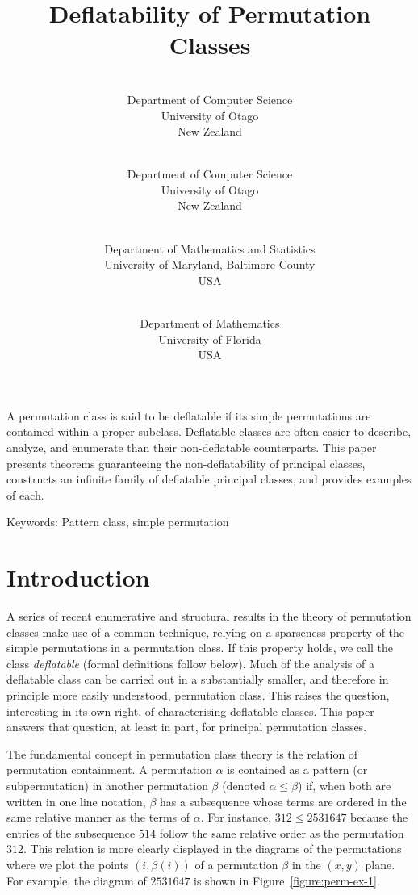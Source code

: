 \documentclass[10pt]{article}
\title{\sc Deflatability of Permutation Classes}
\author{
	\makebox[0.45\linewidth]{M. H. Albert}\\[-0.25ex]
	\small Department of Computer Science\\[-0.5ex]
	\small University of Otago\\[-0.5ex]
	\small New Zealand	
  \and
	\makebox[0.45\linewidth]{M. D. Atkinson\footnote{Corresponding author: \url{mike@cs.otago.ac.nz}}}\\[-0.25ex]
	\small Department of Computer Science\\[-0.5ex]
	\small University of Otago\\[-0.5ex]
	\small New Zealand	
	\and
  \makebox[.45\linewidth]{
	Cheyne Homberger}\\[-0.25ex]
	\small Department of Mathematics and Statistics\\[-0.5ex]
	\small University of Maryland, Baltimore County\\[-0.5ex]
	\small USA
  \and 
  \makebox[.45\linewidth]{
	Jay Pantone\footnote{Pantone's research was sponsored by the National Science Foundation under Grant Number DMS-1301692.}}\\[-0.25ex]
	\small Department of Mathematics\\[-0.5ex]
	\small University of Florida\\[-0.5ex]
	\small USA	
}
\date{}
\theoremstyle{plain}
\renewenvironment{abstract}%
                {
                  \begin{list}{}%
                     {\setlength{\rightmargin}{1in}%
                      \setlength{\leftmargin}{1in}}%
                   \item[]\ignorespaces\begin{small}}%
                 {\end{small}\unskip\end{list}}
\begin{document}
\maketitle

\pagestyle{main}

\begin{abstract}
A permutation class is said to be deflatable if its simple permutations are contained within a proper subclass. Deflatable classes are often easier to describe, analyze, and enumerate than their non-deflatable counterparts. This paper presents theorems guaranteeing the non-deflatability of principal classes, constructs an infinite family of deflatable principal classes, and provides examples of each. 

Keywords: {Pattern class, simple permutation}
\end{abstract}


\section{Introduction}
\label{section:introduction}

A series of recent enumerative and structural results in the theory of permutation classes make use of a common technique, relying on a sparseness property of the simple permutations in a permutation class. If this property holds, we call the class \emph{deflatable} (formal definitions follow below).  Much of the analysis of a deflatable class can be carried out in a substantially smaller, and therefore in principle more easily understood, permutation class. This raises the question, interesting in its own right, of characterising deflatable classes. This paper answers that question, at least in part, for principal permutation classes.


The fundamental concept in permutation class theory is the relation of permutation containment.  A permutation $\alpha$ is contained as a pattern (or subpermutation) in another permutation $\beta$ (denoted $\alpha\leq\beta$) if, when both are written in one line notation, $\beta$ has a subsequence whose terms are ordered in the same relative manner as the terms of $\alpha$. For instance, $312\leq 2531647$ because the entries of the subsequence $514$ follow the same relative order as the permutation $312$.  This relation is more clearly displayed in the diagrams of the permutations where we plot the points $(i, \beta(i))$ of a permutation $\beta$ in the $(x,y)$ plane.  For example, the diagram of $2531647$ is shown in Figure~\ref{figure:perm-ex-1}.
\end{document}
